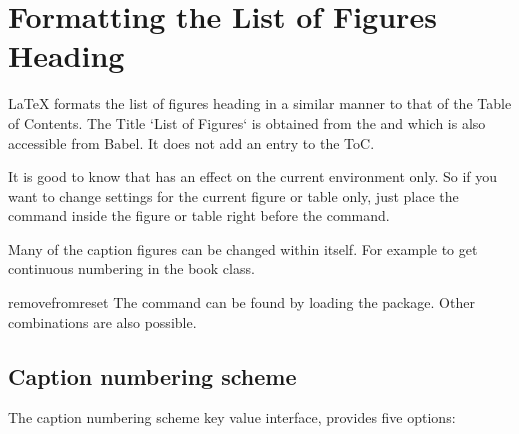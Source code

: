 \section{Formatting the List of Figures Heading}

LaTeX formats the list of figures heading in a similar manner to that of the Table of Contents. The Title `List of Figures` is obtained from the  and which is also accessible from Babel. It does not add an entry to the ToC.



It is good to know that  has an effect on the current environment only.
So if you want to change settings for the current figure or table only, just place the
 command inside the figure or table right before the 
command.


Many of the caption figures can be changed within \latexe itself. For example to get continuous numbering in the book class.

\begin{teXXX}
\makeatletter
{}
\renewcommand{\thetable}{\arabic{table}}
\makeatother
\end{teXXX}

\begin{macro}{removefromreset}
The command  can be found by loading the  package. Other combinations are also possible.
\end{macro}

\subsection{Caption numbering scheme}

The caption numbering scheme key value interface, provides five
options: 
\medskip

